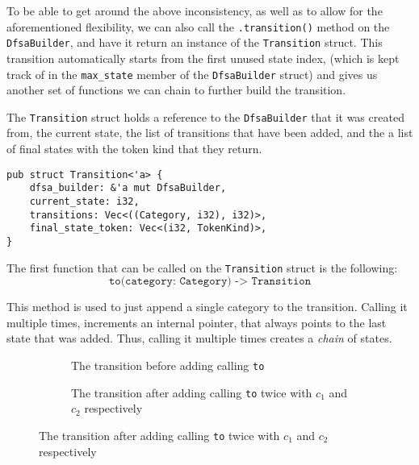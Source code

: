 \documentclass{article}
\newcommand{\code}[1]{\texttt{#1}}
\begin{document}
To be able to get around the above inconsistency, as well as to allow for the
aforementioned flexibility, we can also call the \code{.transition()} method on
the \code{DfsaBuilder}, and have it return an instance of the \code{Transition}
struct. This transition automatically starts from the first unused state index,
(which is kept track of in the \code{max\_state} member of the
\code{DfsaBuilder} struct) and gives us another set of functions we can chain to
further build the transition.

The \code{Transition} struct holds a reference to the \code{DfsaBuilder} that it
was created from, the current state, the list of transitions that have been
added, and the a list of final states with the token kind that they return.

\begin{mainbox}{}
    \lstset{xleftmargin=1cm}
    \begin{lstlisting}
pub struct Transition<'a> {
    dfsa_builder: &'a mut DfsaBuilder,
    current_state: i32,
    transitions: Vec<((Category, i32), i32)>,
    final_state_token: Vec<(i32, TokenKind)>,
}
    \end{lstlisting}
\end{mainbox}


The first function that can be called on the \code{Transition} struct is the following:
$$\code{to(category: Category) -> Transition}$$

This method is used to just append a single category to the transition. Calling
it multiple times, increments an internal pointer, that always points to the
last state that was added. Thus, calling it multiple times creates a
\textit{chain} of states.


\begin{figure}[H]
    \begin{subfigure}[t]{0.5\textwidth}
        \centering
        \caption{The transition before adding calling \code{to}}
    \end{subfigure}
    \begin{subfigure}[t]{0.5\textwidth}
        \centering
        \caption{The transition after adding calling \code{to} twice with $c_1$ and $c_2$ respectively}
    \end{subfigure}
\end{figure}
\end{document}
